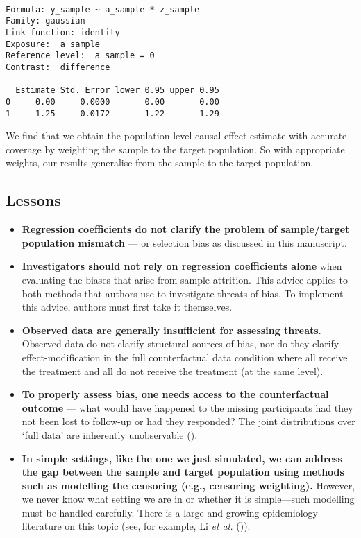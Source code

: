 \documentclass[
  single column]{article}
\providecommand{\tightlist}{%
  \setlength{\itemsep}{0pt}\setlength{\parskip}{0pt}}\usepackage{longtable,booktabs,array}
\begin{document}
\begin{verbatim}

Formula: y_sample ~ a_sample * z_sample
Family: gaussian 
Link function: identity 
Exposure:  a_sample 
Reference level:  a_sample = 0 
Contrast:  difference 

  Estimate Std. Error lower 0.95 upper 0.95
0     0.00     0.0000       0.00       0.00
1     1.25     0.0172       1.22       1.29
\end{verbatim}

We find that we obtain the population-level causal effect estimate with
accurate coverage by weighting the sample to the target population. So
with appropriate weights, our results generalise from the sample to the
target population.

\subsection{Lessons}\label{lessons}

\begin{itemize}
\tightlist
\item
  \textbf{Regression coefficients do not clarify the problem of
  sample/target population mismatch} --- or selection bias as discussed
  in this manuscript.
\item
  \textbf{Investigators should not rely on regression coefficients
  alone} when evaluating the biases that arise from sample attrition.
  This advice applies to both methods that authors use to investigate
  threats of bias. To implement this advice, authors must first take it
  themselves.
\item
  \textbf{Observed data are generally insufficient for assessing
  threats}. Observed data do not clarify structural sources of bias, nor
  do they clarify effect-modification in the full counterfactual data
  condition where all receive the treatment and all do not receive the
  treatment (at the same level).
\item
  \textbf{To properly assess bias, one needs access to the
  counterfactual outcome} --- what would have happened to the missing
  participants had they not been lost to follow-up or had they
  responded? The joint distributions over `full data' are inherently
  unobservable ().
\item
  \textbf{In simple settings, like the one we just simulated, we can
  address the gap between the sample and target population using methods
  such as modelling the censoring (e.g., censoring weighting).} However,
  we never know what setting we are in or whether it is simple---such
  modelling must be handled carefully. There is a large and growing
  epidemiology literature on this topic (see, for example, Li \emph{et
  al.} ()).
\end{itemize}
\end{document}
